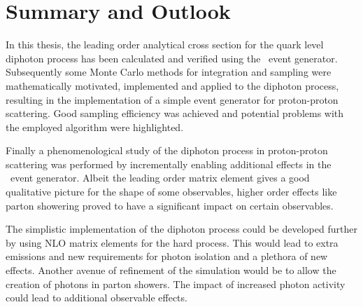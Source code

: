 \chapter{Summary and Outlook}%
\label{chap:summary}

In this thesis, the leading order analytical cross section for the
quark level diphoton process has been calculated and verified using
the \sherpa\ event generator. Subsequently some Monte Carlo methods
for integration and sampling were mathematically motivated,
implemented and applied to the diphoton process, resulting in the
implementation of a simple event generator for proton-proton
scattering. Good sampling efficiency was achieved and potential
problems with the employed algorithm were highlighted.

Finally a phenomenological study of the diphoton process in
proton-proton scattering was performed by incrementally enabling
additional effects in the \sherpa\ event generator. Albeit the leading
order matrix element gives a good qualitative picture for the shape of
some observables, higher order effects like parton showering proved to
have a significant impact on certain observables.

The simplistic implementation of the diphoton process could be
developed further by using NLO matrix elements for the hard
process. This would lead to extra emissions and new requirements for
photon isolation and a plethora of new effects. Another avenue of
refinement of the simulation would be to allow the creation of photons
in parton showers. The impact of increased photon activity could lead
to additional observable effects.


